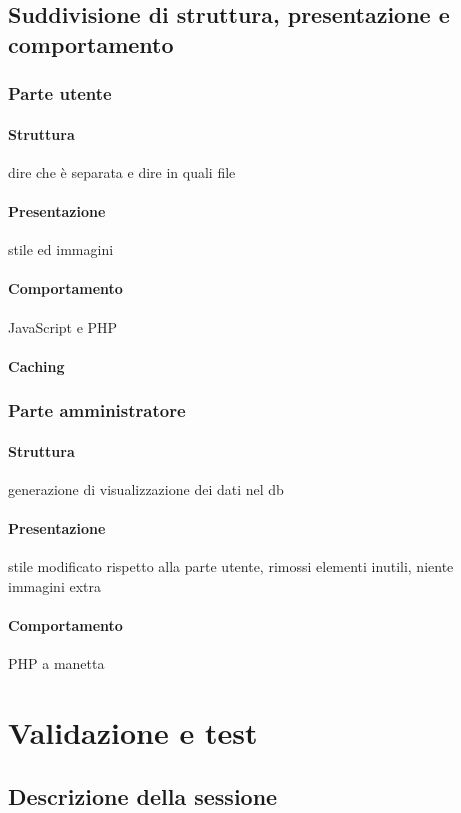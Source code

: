\documentclass[openany, a4paper, 12pt]{report}
\begin{document}
	\section{Suddivisione di struttura, presentazione e comportamento}
	\subsection{Parte utente}
	\subsubsection{Struttura}
	dire che è separata e dire in quali file
	\subsubsection{Presentazione}
	stile ed immagini
	\subsubsection{Comportamento}
	JavaScript e PHP
	\subsubsection{Caching}
	
	\subsection{Parte amministratore}
	\subsubsection{Struttura}
	generazione di visualizzazione dei dati nel db
	\subsubsection{Presentazione}
	stile modificato rispetto alla parte utente, rimossi elementi inutili, niente immagini extra
	\subsubsection{Comportamento}
	PHP a manetta
	
	\chapter{Validazione e test}
	\section{Descrizione della sessione}
\end{document}
